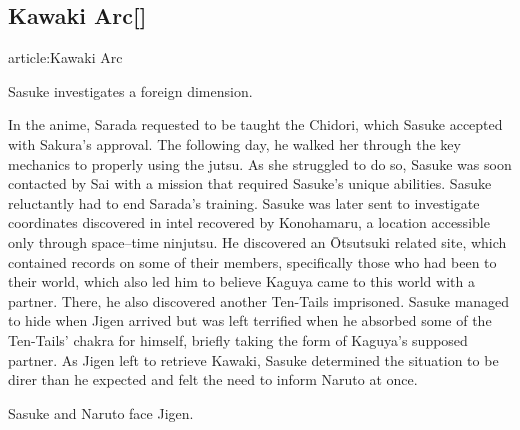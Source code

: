 \documentclass[a4paper,12pt]{article}
\begin{document}
\subsection*{Kawaki Arc[]}\n\nMain article:Kawaki Arc\\ \par \vspace{0.5cm}

Sasuke investigates a foreign dimension.\\ \par \vspace{0.5cm}

In the anime, Sarada requested to be taught the Chidori, which Sasuke accepted with Sakura's approval. The following day, he walked her through the key mechanics to properly using the jutsu. As she struggled to do so, Sasuke was soon contacted by Sai with a mission that required Sasuke's unique abilities. Sasuke reluctantly had to end Sarada's training. Sasuke was later sent to investigate coordinates discovered in intel recovered by Konohamaru, a location accessible only through space–time ninjutsu. He discovered an Ōtsutsuki related site, which contained records on some of their members, specifically those who had been to their world, which also led him to believe Kaguya came to this world with a partner. There, he also discovered another Ten-Tails imprisoned. Sasuke managed to hide when Jigen arrived but was left terrified when he absorbed some of the Ten-Tails' chakra for himself, briefly taking the form of Kaguya's supposed partner. As Jigen left to retrieve Kawaki, Sasuke determined the situation to be direr than he expected and felt the need to inform Naruto at once.\\ \par \vspace{0.5cm}

Sasuke and Naruto face Jigen.\\ \par \vspace{0.5cm}
\end{document}

